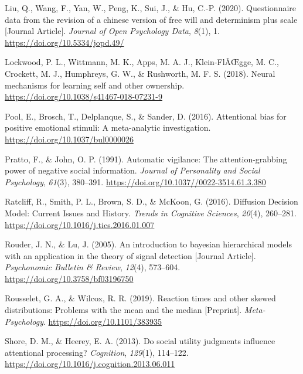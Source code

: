 \documentclass[
  man]{apa6}
\newlength{\cslhangindent}
\newlength{\cslentryspacingunit} %
\newenvironment{CSLReferences}[2] %
 {%
  \setlength{\parindent}{0pt}
  \ifodd #1
  \let\oldpar\par
  \def\par{\hangindent=\cslhangindent\oldpar}
  \fi
  \setlength{\parskip}{#2\cslentryspacingunit}
 }%
 {}
\begin{document}
\begin{CSLReferences}{1}{0}
\leavevmode{}%
Liu, Q., Wang, F., Yan, W., Peng, K., Sui, J., \& Hu, C.-P. (2020). Questionnaire data from the revision of a chinese version of free will and determinism plus scale {[}Journal Article{]}. \emph{Journal of Open Psychology Data}, \emph{8}(1), 1. \url{https://doi.org/10.5334/jopd.49/}

\leavevmode{}%
Lockwood, P. L., Wittmann, M. K., Apps, M. A. J., Klein-FlÃŒgge, M. C., Crockett, M. J., Humphreys, G. W., \& Rushworth, M. F. S. (2018). Neural mechanisms for learning self and other ownership. \url{https://doi.org/10.1038/s41467-018-07231-9}

\leavevmode{}%
Pool, E., Brosch, T., Delplanque, S., \& Sander, D. (2016). Attentional bias for positive emotional stimuli: A meta-analytic investigation. \url{https://doi.org/10.1037/bul0000026}

\leavevmode{}%
Pratto, F., \& John, O. P. (1991). Automatic vigilance: The attention-grabbing power of negative social information. \emph{Journal of Personality and Social Psychology}, \emph{61}(3), 380--391. \url{https://doi.org/10.1037//0022-3514.61.3.380}

\leavevmode{}%
Ratcliff, R., Smith, P. L., Brown, S. D., \& McKoon, G. (2016). Diffusion {Decision} {Model}: {Current} {Issues} and {History}. \emph{Trends in Cognitive Sciences}, \emph{20}(4), 260--281. \url{https://doi.org/10.1016/j.tics.2016.01.007}

\leavevmode{}%
Rouder, J. N., \& Lu, J. (2005). An introduction to bayesian hierarchical models with an application in the theory of signal detection {[}Journal Article{]}. \emph{Psychonomic Bulletin \& Review}, \emph{12}(4), 573--604. \url{https://doi.org/10.3758/bf03196750}

\leavevmode{}%
Rousselet, G. A., \& Wilcox, R. R. (2019). Reaction times and other skewed distributions: Problems with the mean and the median {[}Preprint{]}. \emph{Meta-Psychology}. \url{https://doi.org/10.1101/383935}

\leavevmode{}%
Shore, D. M., \& Heerey, E. A. (2013). Do social utility judgments influence attentional processing? \emph{Cognition}, \emph{129}(1), 114--122. \url{https://doi.org/10.1016/j.cognition.2013.06.011}


\end{CSLReferences}
\end{document}

